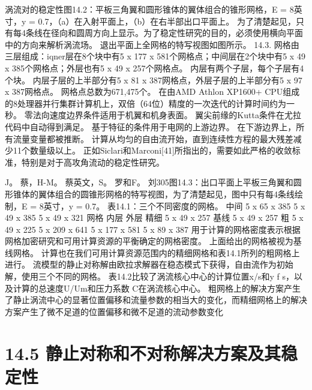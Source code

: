 \documentclass[UTF8,11pt,a4paper,openany,fontset=fandol]{ctexbook}
\begin{document}
涡流对的稳定性图14.2：平板三角翼和圆形锥体的翼体组合的锥形网格，E = 8英寸，y = 0.7，（a）在入射平面上，（b）在右半部出口平面上。 为了清楚起见，只有每4条线在径向和圆周方向上显示。为了稳定性研究的目的，必须使用横向平面中的方向来解析涡流场。 退出平面上全网格的特写视图如图所示。 14.3. 网格由三层组成：iqner层在8个块中有5 x 177 x 581个网格点；中间层在2个块中有5 x 49 x 385个网格点；外层也有5 x 49 x 257个网格点。 内层有两个子层，每个子层有4个块。 内层子层的上半部分有5 x 81 x 387网格点，外层子层的上半部分有5 x 97 x 387网格点。 网格点总数为671,475个。 在由AMD Athlon XP1600+ CPU组成的8处理器并行集群计算机上，双倍（64位）精度的一次迭代的计算时间约为一秒。 零法向速度边界条件适用于机翼和机身表面。 翼尖前缘的Kutta条件在尤拉代码中自动得到满足。 基于特征的条件用于电网的上游边界。 在下游边界上，所有流量变量都被推断。 计算从均匀的自由流开始，直到连续性方程的最大残差减少11个数量级以上。 正如Siclari和Marconi[41]所指出的，需要如此严格的收敛标准，特别是对于高攻角流动的稳定性研究。

J。 蔡，H-M。 蔡英文，S。 罗和F。 刘305图14.3：出口平面上平板三角翼和圆形锥体的翼体组合的圆锥形网格的特写视图，为了清楚起见，图中只有每4条线绘制，E = 8英寸，y = 0.7。 表14.1：三个不同密度的网格。 中间 5 x 65 x 385 5 x 49 x 385 5 x 49 x 321 网格 内层 外层 精细 5 x 49 x 257 基线 5 x 49 x 257 粗 5 x 49 x 225 5 x 209 x 641 5 x 177 x 581 5 x 89 x 387 用于计算的网格密度表示根据网格加密研究和可用计算资源的平衡确定的网格密度。 上面给出的网格被视为基线网格。 计算也在我们可用计算资源范围内的精细网格和表14.1所列的粗网格上进行。 流模型的静止对称解由欧拉求解器在稳态模式下获得，自由流作为初始解，使用三个不同的网格。 表14.2比较了涡流核心中心的计算位置x/s和y f s，以及计算的总速度U/Um和压力系数 C在涡流核心中心。 粗网格上的解决方案产生了静止涡流中心的显著位置偏移和流量参数的相当大的变化，而精细网格上的解决方案产生了微不足道的位置偏移和微不足道的流动参数变化

\section{14.5 静止对称和不对称解决方案及其稳定性}
\end{document}
